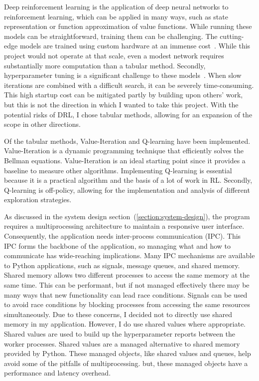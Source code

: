 \documentclass[]{final_report}
\begin{document}
Deep reinforcement learning is the application of deep neural networks to reinforcement learning, which can be applied in many ways, such as state representation or function approximation of value functions. While running these models can be straightforward, training them can be challenging. The cutting-edge models are trained using custom hardware at an immense cost~\cite{DeepRLCost}. While this project would not operate at that scale, even a modest network requires substantially more computation than a tabular method. Secondly, hyperparameter tuning is a significant challenge to these models~\cite{deepRLChallanges}. When slow iterations are combined with a difficult search, it can be severely time-consuming. This high startup cost can be mitigated partly by building upon others' work, but this is not the direction in which I wanted to take this project. With the potential risks of DRL, I chose tabular methods, allowing for an expansion of the scope in other directions.

Of the tabular methods, Value-Iteration and Q-learning have been implemented. Value-Iteration is a dynamic programming technique that efficiently solves the Bellman equations. Value-Iteration is an ideal starting point since it provides a baseline to measure other algorithms. Implementing Q-learning is essential because it is a practical algorithm and the basis of a lot of work in RL. Secondly, Q-learning is off-policy, allowing for the implementation and analysis of different exploration strategies. 

As discussed in the system design section~(\ref{section:system-design}), the program requires a multiprocessing architecture to maintain a responsive user interface. Consequently, the application needs inter-process communication (IPC). This IPC forms the backbone of the application, so managing what and how to communicate has wide-reaching implications. Many IPC mechanisms are available to Python applications, such as signals, message queues, and shared memory. Shared memory allows two different processes to access the same memory at the same time. This can be performant, but if not managed effectively there may be many ways that new functionality can lead race conditions. Signals can be used to avoid race conditions by blocking processes from accessing the same resources simultaneously. Due to these concerns, I decided not to directly use shared memory in my application. However, I do use shared values where appropriate. Shared values are used to build up the hyperparameter reports between the worker processes. Shared values are a managed alternative to shared memory provided by Python. These managed objects, like shared values and queues, help avoid some of the pitfalls of multiprocessing. but, these managed objects have a performance and latency overhead. 
\end{document}
